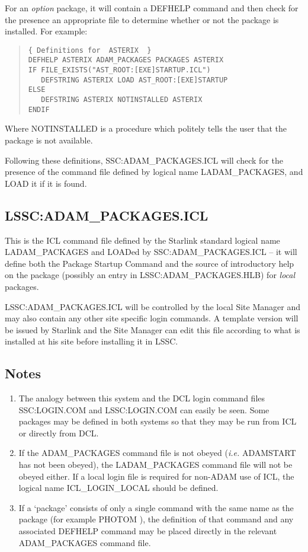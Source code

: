 For an {\em option} package, it will contain a DEFHELP command and then check
for the presence an appropriate file to determine whether or not the package 
is installed. For example:
\begin{quote}
\begin{verbatim}
{ Definitions for  ASTERIX  }
DEFHELP ASTERIX ADAM_PACKAGES PACKAGES ASTERIX
IF FILE_EXISTS("AST_ROOT:[EXE]STARTUP.ICL")
   DEFSTRING ASTERIX LOAD AST_ROOT:[EXE]STARTUP
ELSE
   DEFSTRING ASTERIX NOTINSTALLED ASTERIX
ENDIF
\end{verbatim}
\end{quote}
Where NOTINSTALLED is a procedure which politely tells the user that the
package is not available.

Following these definitions, SSC:\-ADAM\-\_PACKAGES\-.ICL will check for the
presence of the command file defined by logical name LADAM\-\_PACKAGES, and
LOAD it if it is found.

\subsection{LSSC:ADAM\_PACKAGES.ICL}
This is the ICL command file defined by the Starlink standard logical name
LADAM\-\_PACK\-AGES and LOADed by SSC:\-ADAM\-\_PACKAGES\-.ICL -- it will define
both the Package Startup Command and the source of introductory help on the 
package (possibly an entry in LSSC:\-ADAM\-\_PACKAGES\-.HLB) for {\em local} 
packages.

LSSC:\-ADAM\-\_PACKAGES\-.ICL will be controlled by the local Site Manager and 
may also contain any other site specific login commands.
A template version will be issued by Starlink and the Site Manager can edit 
this file according to what is installed at his site before installing it in 
LSSC.

\subsection{Notes}
\begin{enumerate}
\item The analogy between this system and the DCL login command files 
SSC:\-LOGIN\-.COM and LSSC:\-LOGIN\-.COM can easily be seen.
Some packages may be defined in both systems so that they may be run 
from ICL or directly from DCL.
\item If the ADAM\-\_PACKAGES command file is not obeyed ({\em i.e.}
 ADAM\-START has not been obeyed), the LADAM\-\_PACKAGES command file will not
be obeyed either.
If a local login file is required for non-ADAM use of ICL, the logical name
ICL\-\_LOGIN\-\_LOCAL should be defined.
\item If a `package' consists of only a single command with the same name
as the package (for example PHOTOM \cite{photom}), the definition of that 
command and any associated DEFHELP command may be placed directly in the 
relevant ADAM\-\_PACKAGES command file.
\end{enumerate}

